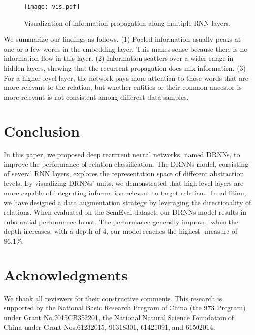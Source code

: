 \documentclass[11pt]{article}
\begin{document}
\begin{figure*}[!t]
\centering
\texttt{[image: vis.pdf]}
\caption{Visualization of information propagation along multiple RNN layers.}
\label{fVis}
\end{figure*}
We summarize our findings as follows. (1) Pooled information usually peaks at one or a few words in the embedding layer. This makes sense because there is no information flow in this layer.  (2) Information scatters over a wider range in hidden layers, showing that the recurrent propagation does  mix information. (3) For a higher-level layer, the network pays more attention to those words that are more relevant to the relation, but whether entities or their common ancestor is more relevant is not consistent among different data samples.



\section{Conclusion}\label{sConclusion}
In this paper, we proposed deep recurrent neural networks, named DRNNs, to improve the performance of relation classification. The DRNNs model, consisting of several RNN layers, explores the representation space of different abstraction levels. By visualizing  DRNNs' units, we demonstrated that high-level layers are more capable of integrating information relevant to target relations. In addition, we have designed a data augmentation strategy by leveraging the directionality of relations.
When evaluated on the SemEval dataset, our DRNNs model results in substantial performance boost. The performance generally improves when the depth increases; with a depth of 4, our model reaches the highest -measure of 86.1\%.

\section*{Acknowledgments}
We thank all reviewers for their constructive comments.
This research is supported by the National Basic Research Program of China (the 973 Program) under Grant No.\@ 2015CB352201, the National Natural Science Foundation of China under Grant Nos.\@ 61232015, 91318301, 61421091, and 61502014. 



\end{document}
